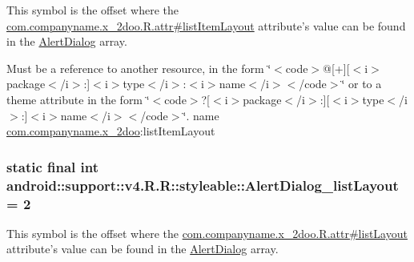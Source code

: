 This symbol is the offset where the \hyperlink{classcom_1_1companyname_1_1x__2doo_1_1_r_1_1attr_f6842dbe0e3f7f127a9c3fbfb45b0a8b}{com.companyname.x\_\-2doo.R.attr\#listItemLayout} attribute's value can be found in the \hyperlink{classandroid_1_1support_1_1v4_1_1_r_1_1styleable_984adead369fc9c6b58c85f88690832f}{AlertDialog} array.

Must be a reference to another resource, in the form \char`\"{}$<$code$>$@\mbox{[}+\mbox{]}\mbox{[}$<$i$>$package$<$/i$>$:\mbox{]}$<$i$>$type$<$/i$>$:$<$i$>$name$<$/i$>$$<$/code$>$\char`\"{} or to a theme attribute in the form \char`\"{}$<$code$>$?\mbox{[}$<$i$>$package$<$/i$>$:\mbox{]}\mbox{[}$<$i$>$type$<$/i$>$:\mbox{]}$<$i$>$name$<$/i$>$$<$/code$>$\char`\"{}.  name \hyperlink{namespacecom_1_1companyname_1_1x__2doo}{com.companyname.x\_\-2doo}:listItemLayout \hypertarget{classandroid_1_1support_1_1v4_1_1_r_1_1styleable_0403be32bcf503a2c849b039a63da598}{
\subsubsection[{AlertDialog\_\-listLayout}]{\setlength{\rightskip}{0pt plus 5cm}static final int android::support::v4.R.R::styleable::AlertDialog\_\-listLayout = 2}}
\label{classandroid_1_1support_1_1v4_1_1_r_1_1styleable_0403be32bcf503a2c849b039a63da598}


This symbol is the offset where the \hyperlink{classcom_1_1companyname_1_1x__2doo_1_1_r_1_1attr_b929b18c30d5976d6e53aae86ad341a2}{com.companyname.x\_\-2doo.R.attr\#listLayout} attribute's value can be found in the \hyperlink{classandroid_1_1support_1_1v4_1_1_r_1_1styleable_984adead369fc9c6b58c85f88690832f}{AlertDialog} array.

